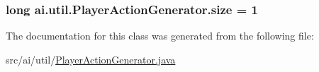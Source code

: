 \label{classai_1_1util_1_1_player_action_generator_a8ca52e8a0afa80cd5df24a68fec7e13d}
\hypertarget{classai_1_1util_1_1_player_action_generator_a8c779395b3ffdf164c9a85cb1032347a}{
\subsubsection[{size}]{\setlength{\rightskip}{0pt plus 5cm}long {\bf ai.util.PlayerActionGenerator.size} = 1}}
\label{classai_1_1util_1_1_player_action_generator_a8c779395b3ffdf164c9a85cb1032347a}


The documentation for this class was generated from the following file:\begin{DoxyCompactItemize}
\item 
src/ai/util/\hyperlink{_player_action_generator_8java}{PlayerActionGenerator.java}\end{DoxyCompactItemize}
